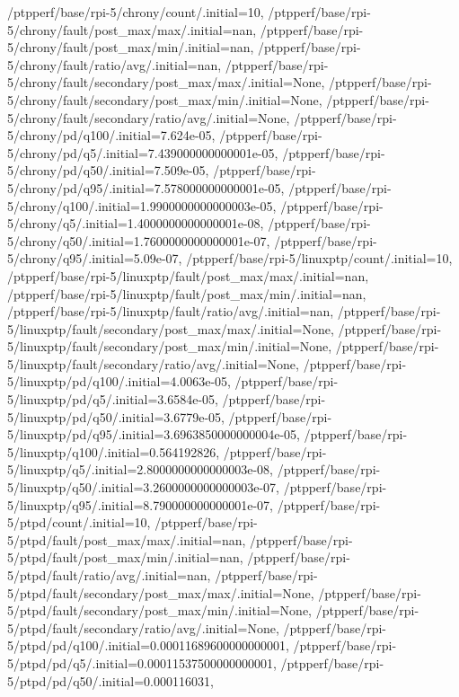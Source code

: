 {    /ptpperf/base/rpi-5/chrony/count/.initial=10,
    /ptpperf/base/rpi-5/chrony/fault/post_max/max/.initial=nan,
    /ptpperf/base/rpi-5/chrony/fault/post_max/min/.initial=nan,
    /ptpperf/base/rpi-5/chrony/fault/ratio/avg/.initial=nan,
    /ptpperf/base/rpi-5/chrony/fault/secondary/post_max/max/.initial=None,
    /ptpperf/base/rpi-5/chrony/fault/secondary/post_max/min/.initial=None,
    /ptpperf/base/rpi-5/chrony/fault/secondary/ratio/avg/.initial=None,
    /ptpperf/base/rpi-5/chrony/pd/q100/.initial=7.624e-05,
    /ptpperf/base/rpi-5/chrony/pd/q5/.initial=7.439000000000001e-05,
    /ptpperf/base/rpi-5/chrony/pd/q50/.initial=7.509e-05,
    /ptpperf/base/rpi-5/chrony/pd/q95/.initial=7.578000000000001e-05,
    /ptpperf/base/rpi-5/chrony/q100/.initial=1.9900000000000003e-05,
    /ptpperf/base/rpi-5/chrony/q5/.initial=1.4000000000000001e-08,
    /ptpperf/base/rpi-5/chrony/q50/.initial=1.7600000000000001e-07,
    /ptpperf/base/rpi-5/chrony/q95/.initial=5.09e-07,
    /ptpperf/base/rpi-5/linuxptp/count/.initial=10,
    /ptpperf/base/rpi-5/linuxptp/fault/post_max/max/.initial=nan,
    /ptpperf/base/rpi-5/linuxptp/fault/post_max/min/.initial=nan,
    /ptpperf/base/rpi-5/linuxptp/fault/ratio/avg/.initial=nan,
    /ptpperf/base/rpi-5/linuxptp/fault/secondary/post_max/max/.initial=None,
    /ptpperf/base/rpi-5/linuxptp/fault/secondary/post_max/min/.initial=None,
    /ptpperf/base/rpi-5/linuxptp/fault/secondary/ratio/avg/.initial=None,
    /ptpperf/base/rpi-5/linuxptp/pd/q100/.initial=4.0063e-05,
    /ptpperf/base/rpi-5/linuxptp/pd/q5/.initial=3.6584e-05,
    /ptpperf/base/rpi-5/linuxptp/pd/q50/.initial=3.6779e-05,
    /ptpperf/base/rpi-5/linuxptp/pd/q95/.initial=3.6963850000000004e-05,
    /ptpperf/base/rpi-5/linuxptp/q100/.initial=0.564192826,
    /ptpperf/base/rpi-5/linuxptp/q5/.initial=2.8000000000000003e-08,
    /ptpperf/base/rpi-5/linuxptp/q50/.initial=3.2600000000000003e-07,
    /ptpperf/base/rpi-5/linuxptp/q95/.initial=8.790000000000001e-07,
    /ptpperf/base/rpi-5/ptpd/count/.initial=10,
    /ptpperf/base/rpi-5/ptpd/fault/post_max/max/.initial=nan,
    /ptpperf/base/rpi-5/ptpd/fault/post_max/min/.initial=nan,
    /ptpperf/base/rpi-5/ptpd/fault/ratio/avg/.initial=nan,
    /ptpperf/base/rpi-5/ptpd/fault/secondary/post_max/max/.initial=None,
    /ptpperf/base/rpi-5/ptpd/fault/secondary/post_max/min/.initial=None,
    /ptpperf/base/rpi-5/ptpd/fault/secondary/ratio/avg/.initial=None,
    /ptpperf/base/rpi-5/ptpd/pd/q100/.initial=0.00011689600000000001,
    /ptpperf/base/rpi-5/ptpd/pd/q5/.initial=0.00011537500000000001,
    /ptpperf/base/rpi-5/ptpd/pd/q50/.initial=0.000116031,
}
